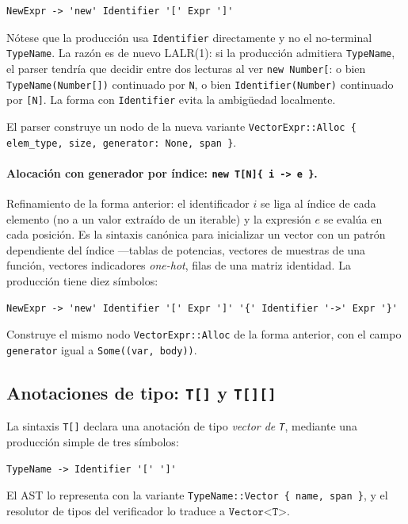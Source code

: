\documentclass[11pt,a4paper,oneside,openany]{report}
\newcommand{\code}[1]{\texttt{#1}}
\begin{document}
\begin{lstlisting}[style=bnf]
NewExpr -> 'new' Identifier '[' Expr ']'
\end{lstlisting}

Nótese que la producción usa \code{Identifier} directamente y no el
no-terminal \code{TypeName}. La razón es de nuevo LALR(1): si la
producción admitiera \code{TypeName}, el parser tendría que decidir entre
dos lecturas al ver \code{new Number[}: o bien \code{TypeName(Number[])}
continuado por \code{N}, o bien \code{Identifier(Number)} continuado por
\code{[N]}. La forma con \code{Identifier} evita la ambigüedad localmente.

El parser construye un nodo de la nueva variante \code{VectorExpr::Alloc
\{ elem\_type, size, generator: None, span \}}.

\paragraph{Alocación con generador por índice: \code{new T[N]\{ i -> e \}}.}
Refinamiento de la forma anterior: el identificador $i$ se liga al índice
de cada elemento (no a un valor extraído de un iterable) y la expresión
$e$ se evalúa en cada posición. Es la sintaxis canónica para inicializar
un vector con un patrón dependiente del índice ---tablas de potencias,
vectores de muestras de una función, vectores indicadores \emph{one-hot},
filas de una matriz identidad. La producción tiene diez símbolos:

\begin{lstlisting}[style=bnf]
NewExpr -> 'new' Identifier '[' Expr ']' '{' Identifier '->' Expr '}'
\end{lstlisting}

Construye el mismo nodo \code{VectorExpr::Alloc} de la forma anterior, con
el campo \code{generator} igual a \code{Some((var, body))}.

\subsection{Anotaciones de tipo: \code{T[]} y \code{T[][]}}

La sintaxis \code{T[]} declara una anotación de tipo \emph{vector de
\code{T}}, mediante una producción simple de tres símbolos:

\begin{lstlisting}[style=bnf]
TypeName -> Identifier '[' ']'
\end{lstlisting}

El AST lo representa con la variante \code{TypeName::Vector \{ name,
span \}}, y el resolutor de tipos del verificador lo traduce a
$\code{Vector<T>}$.
\end{document}
